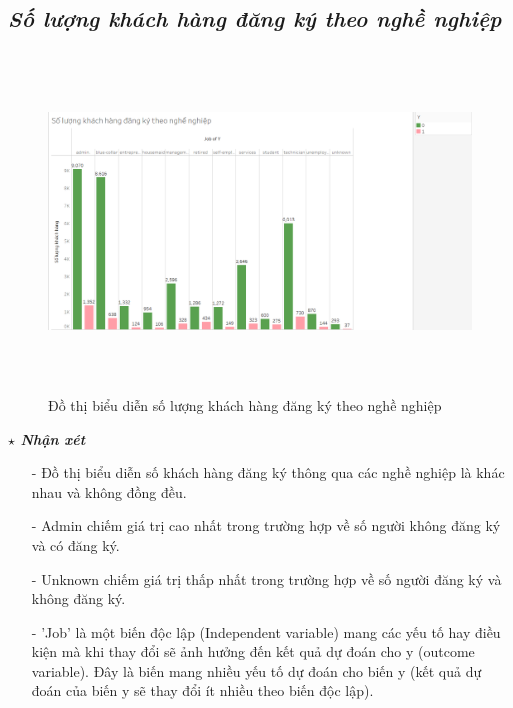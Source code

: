 \documentclass{report}
\begin{document}
\subsection{\textit{Số lượng khách hàng đăng ký theo nghề nghiệp}}
         \begin{center}
        \begin{figure}[htp]
    	\begin{center}
    		\includegraphics[width=15cm, height=9cm]{images/hinh2.png}
    	\end{center}
    		\caption{Đồ thị biểu diễn số lượng khách hàng đăng ký theo nghề nghiệp}
    \end{figure}
    \end{center}
    \fontsize{13}{14}\selectfont \textbf{$\star$\textit{ Nhận xét}}
    \begin{enumerate}
        \item[- ] Đồ thị biểu diễn số khách hàng đăng ký thông qua các nghề nghiệp là khác nhau và không đồng đều.
        \item[- ] Admin chiếm giá trị cao nhất trong trường hợp về số người không đăng ký và có đăng ký.
        \item[- ] Unknown chiếm giá trị thấp nhất trong trường hợp về số người đăng ký và không đăng ký.
        \item[- ]'Job' là một biến độc lập (Independent variable) mang các yếu tố hay điều kiện mà khi thay đổi sẽ ảnh hưởng đến kết quả dự đoán cho y (outcome variable). Đây là biến mang nhiều yếu tố dự đoán cho biến y (kết quả dự đoán của biến y sẽ thay đổi ít nhiều theo biến độc lập).
    \end{enumerate}
    
\end{document}
